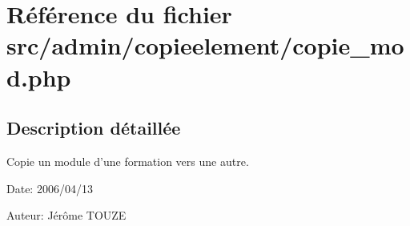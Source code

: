 \section{Référence du fichier src/admin/copieelement/copie\_\-mod.php}
\label{copie__mod_8php}


\subsection{Description détaillée}
Copie un module d'une formation vers une autre. 

\begin{Desc}
\item[Date:]2006/04/13\end{Desc}
\begin{Desc}
\item[Auteur:]Jérôme TOUZE \end{Desc}


